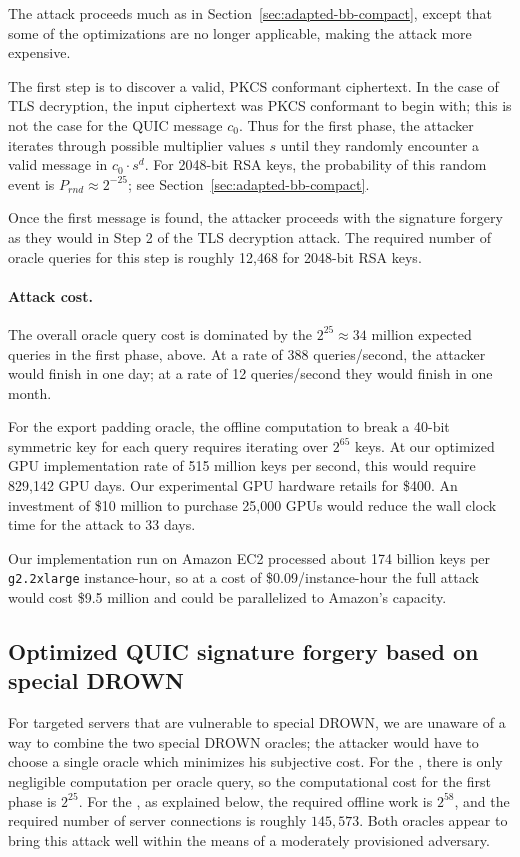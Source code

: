 The attack proceeds much as in Section~\ref{sec:adapted-bb-compact}, except that some of the optimizations are no longer applicable, making the attack more expensive.

The first step is to discover a valid, PKCS conformant \ssltwo ciphertext.  In the case of TLS decryption, the input ciphertext was PKCS conformant to begin with; this is not the case for the QUIC message $c_0$.  
Thus for the first phase, the attacker iterates through possible multiplier values $s$ until they randomly encounter a valid \ssltwo message in $c_0 \cdot s^d$. 
For 2048-bit RSA keys, the probability of this random event is $P_{rnd} \approx 2^{-25}$; see Section~\ref{sec:adapted-bb-compact}.

Once the first \sslconform message is found, the attacker proceeds with the signature forgery as they would in Step 2 of the  TLS decryption attack\@. The required number of oracle queries for this step is roughly 12,468 for 2048-bit RSA keys.

\paragraph{Attack cost.}
The overall oracle query cost is dominated by the $2^{25} \approx 34$ million expected queries in the first phase, above.  At a rate of 388 queries/second, the attacker would finish in one day; at a rate of 12 queries/second they would finish in one month.

For the \ssltwo export padding oracle, the offline computation to break a 40-bit symmetric key for each query requires iterating over $2^{65}$ keys.
At our optimized GPU implementation rate of 515 million keys per second, this would require 829,142 GPU days.
Our experimental GPU hardware retails for \$400.  An investment of \$10 million to purchase 25,000 GPUs would reduce the wall clock time for the attack to 33 days.

Our implementation run on Amazon EC2 processed about 174 billion keys per \texttt{g2.2xlarge} instance-hour, so at a cost of \$0.09/instance-hour the full attack would cost \$9.5 million and could be parallelized to Amazon's capacity.

\tabDrownAll

\subsection{Optimized QUIC signature forgery based on special DROWN}
\label{sec:quic_special_drown}
For targeted servers that are vulnerable to special DROWN, we are unaware of
a way to combine the two special DROWN oracles; the attacker would have to
choose a single oracle which minimizes his subjective cost.
For the \tOracleSSLclear, there is only negligible computation per oracle query, so the computational cost for the first phase is $2^{25}$.
For the \tOracleSSLleaky, as explained below, the required offline work is $2^{58}$,
and the required number of server connections is roughly $145,573$.
Both oracles appear to bring this attack well within the means of a
moderately provisioned adversary.

